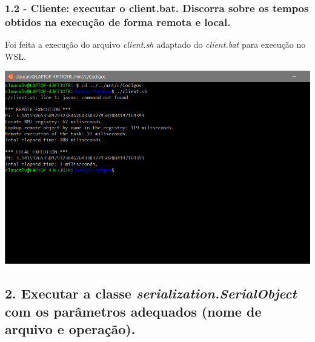 \subsubsection{1.2 - Cliente: executar o client.bat. Discorra sobre os tempos obtidos na
execução de forma remota e local.}

Foi feita a execução do arquivo \textit{client.sh} adaptado do \textit{client.bat} para execução no WSL.

\vspace{2em}
\begin{minipage}{\textwidth}
    \hspace{-1em}
    \centering
    \includegraphics[trim= 0 150 250 0, clip, scale=.4]{prints/client.PNG}
    \label{threadspng}
    \hspace{1em}
\end{minipage}
\vspace{0.5em}


\subsection*{2. Executar a classe \textit{serialization.SerialObject} com os parâmetros adequados (nome de arquivo e operação).}



